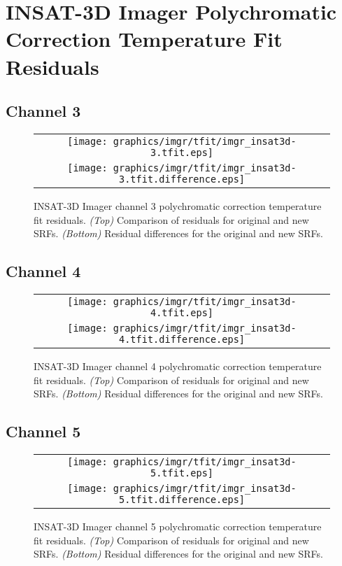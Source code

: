 \section{INSAT-3D Imager Polychromatic Correction Temperature Fit Residuals}
\label{app.imgr_tfit_data_plots}

\subsection{Channel 3}
\begin{figure}[H]
  \label{fig:imgr_ch3_tfit}
  \centering
  \begin{tabular}{c}
    \texttt{[image: graphics/imgr/tfit/imgr\_insat3d-3.tfit.eps]} \\
    \texttt{[image: graphics/imgr/tfit/imgr\_insat3d-3.tfit.difference.eps]}
  \end{tabular}
  \caption{INSAT-3D Imager channel 3 polychromatic correction temperature fit residuals. \emph{(Top)} Comparison of residuals for original and new SRFs. \emph{(Bottom)} Residual differences for the original and new SRFs.}
\end{figure}

\subsection{Channel 4}
\begin{figure}[H]
  \label{fig:imgr_ch4_tfit}
  \centering
  \begin{tabular}{c}
    \texttt{[image: graphics/imgr/tfit/imgr\_insat3d-4.tfit.eps]} \\
    \texttt{[image: graphics/imgr/tfit/imgr\_insat3d-4.tfit.difference.eps]}
  \end{tabular}
  \caption{INSAT-3D Imager channel 4 polychromatic correction temperature fit residuals. \emph{(Top)} Comparison of residuals for original and new SRFs. \emph{(Bottom)} Residual differences for the original and new SRFs.}
\end{figure}

\subsection{Channel 5}
\begin{figure}[H]
  \label{fig:imgr_ch5_tfit}
  \centering
  \begin{tabular}{c}
    \texttt{[image: graphics/imgr/tfit/imgr\_insat3d-5.tfit.eps]} \\
    \texttt{[image: graphics/imgr/tfit/imgr\_insat3d-5.tfit.difference.eps]}
  \end{tabular}
  \caption{INSAT-3D Imager channel 5 polychromatic correction temperature fit residuals. \emph{(Top)} Comparison of residuals for original and new SRFs. \emph{(Bottom)} Residual differences for the original and new SRFs.}
\end{figure}

